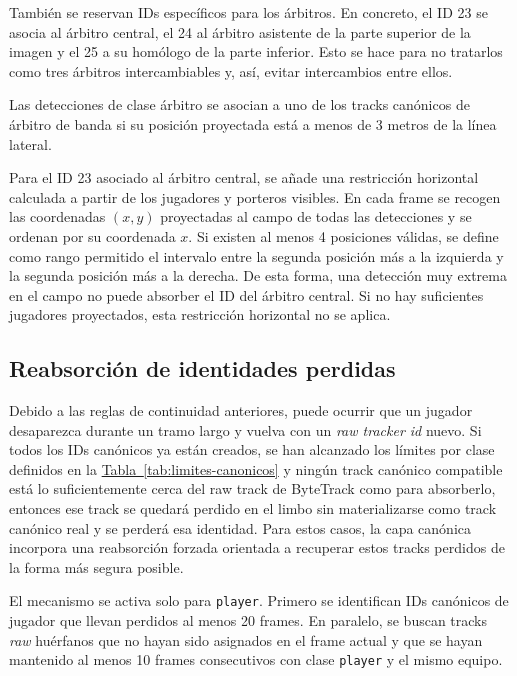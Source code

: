 También se reservan IDs específicos para los árbitros. En concreto, el ID 23 se asocia al árbitro central, el 24 al árbitro asistente de la parte superior de la imagen y el 25 a su homólogo de la parte inferior. Esto se hace para no tratarlos como tres árbitros intercambiables y, así, evitar intercambios entre ellos.

Las detecciones de clase árbitro se asocian a uno de los tracks canónicos de árbitro de banda si su posición proyectada está a menos de 3 metros de la línea lateral.

Para el ID 23 asociado al árbitro central, se añade una restricción horizontal calculada a partir de los jugadores y porteros visibles. En cada frame se recogen las coordenadas $(x, y)$ proyectadas al campo de todas las detecciones y se ordenan por su coordenada $x$. Si existen al menos 4 posiciones válidas, se define como rango permitido el intervalo entre la segunda posición más a la izquierda y la segunda posición más a la derecha. De esta forma, una detección muy extrema en el campo no puede absorber el ID del árbitro central. Si no hay suficientes jugadores proyectados, esta restricción horizontal no se aplica.

\subsection{Reabsorción de identidades perdidas}
\label{subsec:reabsorcion-identidades}

Debido a las reglas de continuidad anteriores, puede ocurrir que un jugador desaparezca durante un tramo largo y vuelva con un \textit{raw tracker id} nuevo. Si todos los IDs canónicos ya están creados, se han alcanzado los límites por clase definidos en la \hyperref[tab:limites-canonicos]{Tabla~\ref*{tab:limites-canonicos}} y ningún track canónico compatible está lo suficientemente cerca del raw track de ByteTrack como para absorberlo, entonces ese track se quedará perdido en el limbo sin materializarse como track canónico real y se perderá esa identidad. Para estos casos, la capa canónica incorpora una reabsorción forzada orientada a recuperar estos tracks perdidos de la forma más segura posible.

El mecanismo se activa solo para \texttt{player}. Primero se identifican IDs canónicos de jugador que llevan perdidos al menos 20 frames. En paralelo, se buscan tracks \textit{raw} huérfanos que no hayan sido asignados en el frame actual y que se hayan mantenido al menos 10 frames consecutivos con clase \texttt{player} y el mismo equipo.

